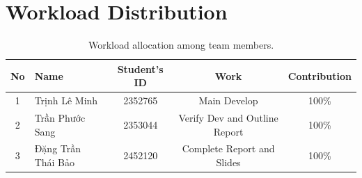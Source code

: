 \section*{Workload Distribution}

\begin{table}[H]
\centering
\renewcommand{\arraystretch}{1.3}
\begin{tabular}{|c|l|c|c|c|}
\hline
\textbf{No} & \textbf{Name} & \textbf{Student's ID} & \textbf{Work} & \textbf{Contribution} \\
\hline
1 & Trịnh Lê Minh   & 2352765 & Main Develop & 100\% \\
\hline
2 & Trần Phước Sang & 2353044 & Verify Dev and Outline Report & 100\% \\
\hline
3 & Đặng Trần Thái Bảo     & 2452120  & Complete Report and Slides & 100\% \\
\hline
\end{tabular}
\caption{Workload allocation among team members.}
\label{tab:workload_distribution}
\end{table}

